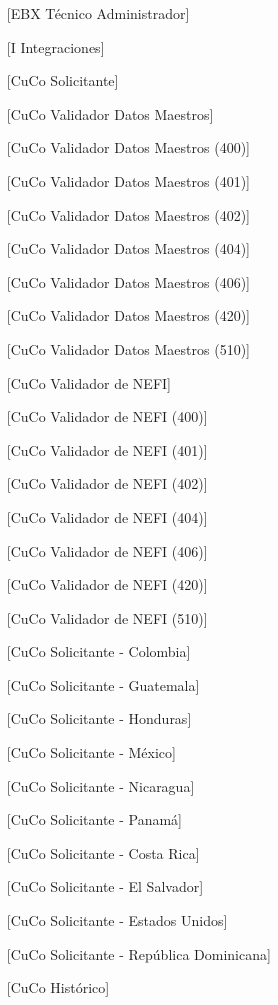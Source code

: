 \begin{itemize}

    \item [[EBX] Técnico Administrador]
    \item [[I] Integraciones]
    \item [[CuCo] Solicitante]
    \item [[CuCo] Validador Datos Maestros]
    \item [[CuCo] Validador Datos Maestros (400)]
    \item [[CuCo] Validador Datos Maestros (401)]
    \item [[CuCo] Validador Datos Maestros (402)]
    \item [[CuCo] Validador Datos Maestros (404)]
    \item [[CuCo] Validador Datos Maestros (406)]
    \item [[CuCo] Validador Datos Maestros (420)]
    \item [[CuCo] Validador Datos Maestros (510)]
    \item [[CuCo] Validador de NEFI]
    \item [[CuCo] Validador de NEFI (400)]
    \item [[CuCo] Validador de NEFI (401)]
    \item [[CuCo] Validador de NEFI (402)]
    \item [[CuCo] Validador de NEFI (404)]
    \item [[CuCo] Validador de NEFI (406)]
    \item [[CuCo] Validador de NEFI (420)]
    \item [[CuCo] Validador de NEFI (510)]
    \item [[CuCo] Solicitante - Colombia]
    \item [[CuCo] Solicitante - Guatemala]
    \item [[CuCo] Solicitante - Honduras]
    \item [[CuCo] Solicitante - México]
    \item [[CuCo] Solicitante - Nicaragua]
    \item [[CuCo] Solicitante - Panamá]
    \item [[CuCo] Solicitante - Costa Rica]
    \item [[CuCo] Solicitante - El Salvador]
    \item [[CuCo] Solicitante - Estados Unidos]
    \item [[CuCo] Solicitante - República Dominicana]
    \item [[CuCo] Histórico]

\end{itemize}